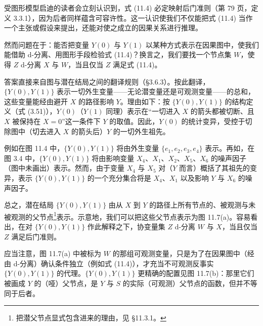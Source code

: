 受图形模型启迪的读者会立刻认识到，式 (11.4) 必定映射后门准则（第 79 页，定义 3.3.1），因为后者同样蕴含可容许性。这一认识使我们不仅能把式 (11.4) 当作一个主张或假设来提出，还能对使之成立的因果关系进行推理。

然而问题在于：能否把变量 $Y(0)$ 与 $Y(1)$ 以某种方式表示在因果图中，使我们能借助 d-分离、用图形手段检验式 (11.4)？换言之，我们要找一个节点集 $W$，使得 $Z$ d-分离 $X$ 与 $W$，当且仅当 $Z$ 满足式 (11.4)。

答案直接来自图与潜在结局之间的翻译规则（\S 3.6.3）。按此翻译，$\{Y(0),Y(1)\}$ 表示一切外生变量——无论潜变量还是可观测变量——的总和，这些变量能经由避开 $X$ 的路径影响 $Y$。理由如下：按 $\{Y(0),Y(1)\}$ 的结构定义（式 (3.51)），$Y(0)$（$Y(1)$ 同理）表示在“一切进入 $X$ 的箭头都被切断、且 $X$ 被保持在 $X=0$”这一条件下 $Y$ 的取值。因此，$Y(0)$ 的统计变异，受控于切除图中（切去进入 $X$ 的箭头后）$Y$ 的一切外生祖先。

例如在图 11.4 中，$\{Y(0),Y(1)\}$ 将由外生变量 $\{e_1,e_2,e_3,e_4\}$ 表示。再如，在图 3.4 中，$\{Y(0),Y(1)\}$ 将由影响变量 $X_4$、$X_1$、$X_2$、$X_5$、$X_6$ 的噪声因子（图中未画出）表示。然而，由于变量 $X_4$ 与 $X_5$ 对（$Y$ 而言）概括了其祖先的变异，表示 $\{Y(0),Y(1)\}$ 的一个充分集合将是 $X_4$、$X_1$ 以及影响 $Y$ 与 $X_6$ 的噪声因子。

总之，潜在结局 $\{Y(0),Y(1)\}$ 由从 $X$ 到 $Y$ 的路径上所有节点的、被观测与未被观测的父节点\footnote{把潜父节点显式包含进来的理由，见 \S 11.3.1。}表示。示意地，我们可以把这些父节点表示为图 11.7(a)。容易看出，在对 $\{Y(0),Y(1)\}$ 作此解释之下，协变量集 $Z$ d-分离 $W$ 与 $X$，当且仅当 $Z$ 满足后门准则。

应当注意，图 11.7(a) 中被标为 $W$ 的那组可观测变量，只是为了在因果图中（经由 d-分离）确认条件独立（例如式 (11.4)），才充当不可观测反事实 $\{Y(0),Y(1)\}$ 的代理。$\{Y(0),Y(1)\}$ 更精确的配置见图 11.7(b)：那里它们被画成 $Y$ 的（哑）父节点，是 $Y$ 与 $S$ 的实际（可观测）父节点的函数，但并不等同于后者。

